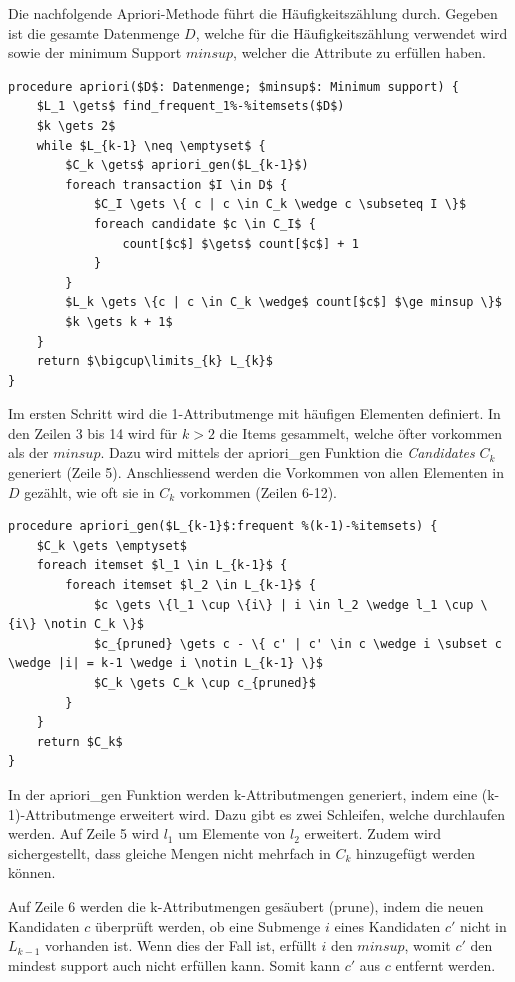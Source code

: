Die nachfolgende Apriori-Methode führt die Häufigkeitszählung durch.
Gegeben ist die gesamte Datenmenge $D$, welche für die Häufigkeitszählung verwendet wird sowie der minimum Support $minsup$, welcher die Attribute zu erfüllen haben.
\begin{lstlisting}[language=pseudocode]
procedure apriori($D$: Datenmenge; $minsup$: Minimum support) {
	$L_1 \gets$ find_frequent_1%-%itemsets($D$)
	$k \gets 2$
	while $L_{k-1} \neq \emptyset$ {
		$C_k \gets$ apriori_gen($L_{k-1}$)
		foreach transaction $I \in D$ {
			$C_I \gets \{ c | c \in C_k \wedge c \subseteq I \}$
			foreach candidate $c \in C_I$ {
				count[$c$] $\gets$ count[$c$] + 1
			}
		}
		$L_k \gets \{c | c \in C_k \wedge$ count[$c$] $\ge minsup \}$
		$k \gets k + 1$
	}
	return $\bigcup\limits_{k} L_{k}$
}
\end{lstlisting}
Im ersten Schritt wird die 1-Attributmenge mit häufigen Elementen definiert. In den Zeilen 3 bis 14 wird für $k > 2$ die Items gesammelt, welche öfter vorkommen als der $minsup$. Dazu wird mittels der apriori\_gen Funktion die \textit{Candidates} $C_k$ generiert (Zeile 5).
Anschliessend werden die Vorkommen von allen Elementen in $D$ gezählt, wie oft sie in $C_k$ vorkommen (Zeilen 6-12).


\begin{lstlisting}[language=pseudocode]
procedure apriori_gen($L_{k-1}$:frequent %(k-1)-%itemsets) {
	$C_k \gets \emptyset$
	foreach itemset $l_1 \in L_{k-1}$ {
		foreach itemset $l_2 \in L_{k-1}$ {
			$c \gets \{l_1 \cup \{i\} | i \in l_2 \wedge l_1 \cup \{i\} \notin C_k \}$
			$c_{pruned} \gets c - \{ c' | c' \in c \wedge i \subset c \wedge |i| = k-1 \wedge i \notin L_{k-1} \}$
			$C_k \gets C_k \cup c_{pruned}$
		}
	}
	return $C_k$
}
\end{lstlisting}
In der apriori\_gen Funktion werden k-Attributmengen generiert, indem eine (k-1)-Attributmenge erweitert wird. Dazu gibt es zwei Schleifen, welche durchlaufen werden. Auf Zeile 5 wird $l_1$ um Elemente von $l_2$ erweitert. Zudem wird sichergestellt, dass gleiche Mengen nicht mehrfach in $C_k$ hinzugefügt werden können.

Auf Zeile 6 werden die k-Attributmengen gesäubert (prune), indem die neuen Kandidaten $c$ überprüft werden, ob eine Submenge $i$ eines Kandidaten $c'$ nicht in $L_{k-1}$ vorhanden ist. Wenn dies der Fall ist, erfüllt $i$ den $minsup$, womit $c'$ den mindest support auch nicht erfüllen kann. Somit kann $c'$ aus $c$ entfernt werden.

